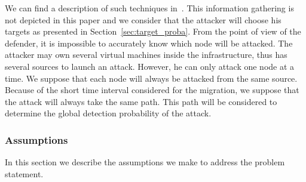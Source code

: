 We can find a description of such techniques in~\cite{Hong2015,Sphinx-Dhawan2015}.
This information gathering is not depicted in this paper and we consider that the attacker will choose his targets as presented in Section~\ref{sec:target_proba}.
From the point of view of the defender, it is impossible to accurately know which node will be attacked.
The attacker may own several virtual machines inside the infrastructure, thus has several sources to launch an attack. However, he can only attack one node at a time. 
We suppose that each node will always be attacked from the same source. 
Because of the short time interval considered for the migration, we suppose that the attack will always take the same path. 
This path will be considered to determine the global detection probability of the attack.







\subsubsection{Assumptions}
\label{sec:hypotheses}
In this section we describe the assumptions we make to address the problem statement.

